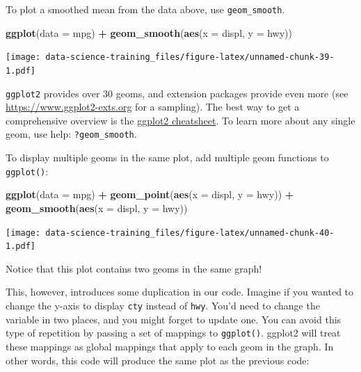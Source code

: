 \documentclass[]{book}
\newenvironment{Shaded}{\begin{snugshade}}{\end{snugshade}}
\newcommand{\KeywordTok}[1]{\textcolor[rgb]{0.13,0.29,0.53}{\textbf{#1}}}
\newcommand{\DataTypeTok}[1]{\textcolor[rgb]{0.13,0.29,0.53}{#1}}
\newcommand{\StringTok}[1]{\textcolor[rgb]{0.31,0.60,0.02}{#1}}
\newcommand{\OperatorTok}[1]{\textcolor[rgb]{0.81,0.36,0.00}{\textbf{#1}}}
\newcommand{\NormalTok}[1]{#1}
\theoremstyle{definition}
\theoremstyle{definition}
\theoremstyle{definition}
\theoremstyle{remark}
\begin{document}
To plot a smoothed mean from the data above, use \texttt{geom\_smooth}.

\begin{Shaded}
\begin{Highlighting}[]
\KeywordTok{ggplot}\NormalTok{(}\DataTypeTok{data =}\NormalTok{ mpg) }\OperatorTok{+}\StringTok{ }
\StringTok{  }\KeywordTok{geom_smooth}\NormalTok{(}\KeywordTok{aes}\NormalTok{(}\DataTypeTok{x =}\NormalTok{ displ, }\DataTypeTok{y =}\NormalTok{ hwy))}
\end{Highlighting}
\end{Shaded}

\texttt{[image: data-science-training\_files/figure-latex/unnamed-chunk-39-1.pdf]}

\texttt{ggplot2} provides over 30 geoms, and extension packages provide
even more (see \url{https://www.ggplot2-exts.org} for a sampling). The
best way to get a comprehensive overview is the
\href{http://rstudio.com/cheatsheets}{ggplot2 cheatsheet}. To learn more
about any single geom, use help: \texttt{?geom\_smooth}.

To display multiple geoms in the same plot, add multiple geom functions
to \texttt{ggplot()}:

\begin{Shaded}
\begin{Highlighting}[]
\KeywordTok{ggplot}\NormalTok{(}\DataTypeTok{data =}\NormalTok{ mpg) }\OperatorTok{+}\StringTok{ }
\StringTok{  }\KeywordTok{geom_point}\NormalTok{(}\KeywordTok{aes}\NormalTok{(}\DataTypeTok{x =}\NormalTok{ displ, }\DataTypeTok{y =}\NormalTok{ hwy)) }\OperatorTok{+}
\StringTok{  }\KeywordTok{geom_smooth}\NormalTok{(}\KeywordTok{aes}\NormalTok{(}\DataTypeTok{x =}\NormalTok{ displ, }\DataTypeTok{y =}\NormalTok{ hwy))}
\end{Highlighting}
\end{Shaded}

\texttt{[image: data-science-training\_files/figure-latex/unnamed-chunk-40-1.pdf]}

Notice that this plot contains two geoms in the same graph!

This, however, introduces some duplication in our code. Imagine if you
wanted to change the y-axis to display \texttt{cty} instead of
\texttt{hwy}. You'd need to change the variable in two places, and you
might forget to update one. You can avoid this type of repetition by
passing a set of mappings to \texttt{ggplot()}. ggplot2 will treat these
mappings as global mappings that apply to each geom in the graph. In
other words, this code will produce the same plot as the previous code:
\end{document}
